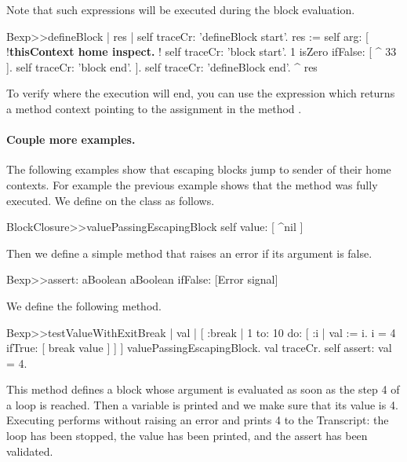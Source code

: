 \documentclass[a4paper,10pt,twoside]{book}
\begin{document}
Note that such expressions will be executed during the block evaluation.

\begin{code}{}
Bexp>>defineBlock
	| res |
	self traceCr: 'defineBlock start'.
	res := self arg: [ !\textbf{thisContext home inspect. }!
					        self traceCr: 'block start'.
                            1 isZero ifFalse: [ ^ 33 ].
                            self traceCr: 'block end'. ].
	self traceCr: 'defineBlock end'.
	^ res
\end{code}

To verify where the execution will end, you can use the expression  which returns a method context pointing to the assignment in the method .

\paragraph{Couple more examples.}
The following examples show that escaping blocks jump to sender of their home contexts. For example the previous example shows that the method  was fully executed.
We define  on the class  as follows.

\begin{code}{}
BlockClosure>>valuePassingEscapingBlock
	  self value: [ ^nil ]
\end{code}

Then we define a simple  method that raises an error if its argument is false.

\begin{code}{}
Bexp>>assert: aBoolean
	aBoolean ifFalse: [Error signal]
\end{code}

We define the following method.

\begin{code}{}
Bexp>>testValueWithExitBreak
	| val |
	[ :break |
	    1 to: 10 do: [ :i |
			         val := i.
			         i = 4 ifTrue: [ break value ] ] ] valuePassingEscapingBlock.
	val traceCr.
	self assert: val = 4.
\end{code}

This method defines a block whose argument  is evaluated as soon as the step 4 of a loop is reached. Then a variable  is printed and we make sure that its value is 4. Executing  performs without raising an error and prints 4 to the Transcript: the loop has been stopped, the value has been printed, and the assert has been validated.
\end{document}
